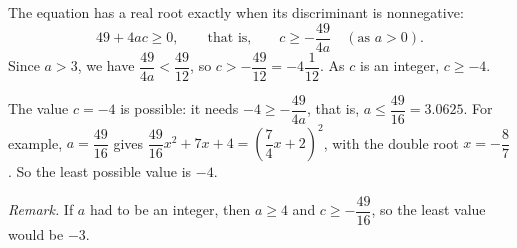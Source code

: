 The equation has a real root exactly when its discriminant is nonnegative:
\[49+4ac\ge0,\qquad\text{that is,}\qquad c\ge-\dfrac{49}{4a}\quad(\text{as }a>0).\]
Since $a>3$, we have $\dfrac{49}{4a}<\dfrac{49}{12}$, so $c>-\dfrac{49}{12}=-4\dfrac{1}{12}$. As $c$ is an integer, $c\ge-4$.

The value $c=-4$ is possible: it needs $-4\ge-\dfrac{49}{4a}$, that is, $a\le\dfrac{49}{16}=3.0625$. For example, $a=\dfrac{49}{16}$ gives $\dfrac{49}{16}x^2+7x+4=\left(\dfrac{7}{4}x+2\right)^2$, with the double root $x=-\dfrac{8}{7}$. So the least possible value is $\boxed{-4}$.

\emph{Remark.} If $a$ had to be an integer, then $a\ge4$ and $c\ge-\dfrac{49}{16}$, so the least value would be $-3$.
